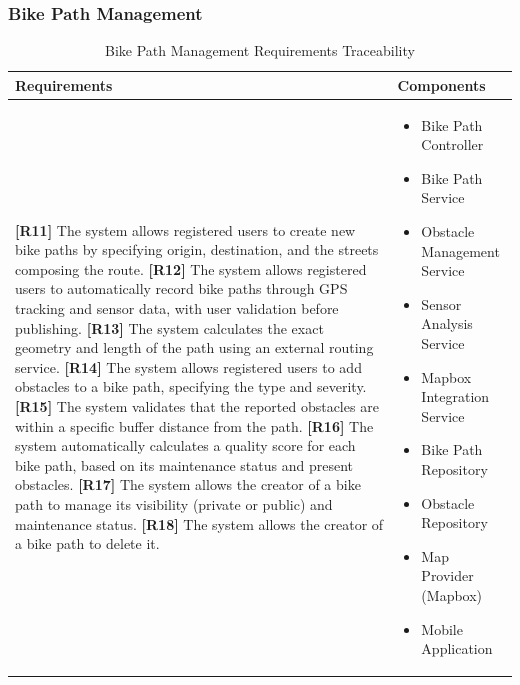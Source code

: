 \subsubsection{Bike Path Management}

\begin{table}[H]
\centering
\begin{tabular}{|p{}|p{}|}
\hline
\textbf{Requirements} & \textbf{Components} \\
\hline

\textbf{[R11]} The system allows registered users to create new bike paths by specifying origin, destination, and the streets composing the route. \newline
\textbf{[R12]} The system allows registered users to automatically record bike paths through GPS tracking and sensor data, with user validation before publishing. \newline
\textbf{[R13]} The system calculates the exact geometry and length of the path using an external routing service. \newline
\textbf{[R14]} The system allows registered users to add obstacles to a bike path, specifying the type and severity. \newline
\textbf{[R15]} The system validates that the reported obstacles are within a specific buffer distance from the path. \newline
\textbf{[R16]} The system automatically calculates a quality score for each bike path, based on its maintenance status and present obstacles. \newline
\textbf{[R17]} The system allows the creator of a bike path to manage its visibility (private or public) and maintenance status. \newline
\textbf{[R18]} The system allows the creator of a bike path to delete it.

&

\begin{itemize}
    \item Bike Path Controller
    \item Bike Path Service
    \item Obstacle Management Service
    \item Sensor Analysis Service
    \item Mapbox Integration Service
    \item Bike Path Repository
    \item Obstacle Repository
    \item Map Provider (Mapbox)
    \item Mobile Application
\end{itemize} \\
\hline

\end{tabular}
\caption{Bike Path Management Requirements Traceability}
\label{tab:bikepath-requirements}
\end{table}

